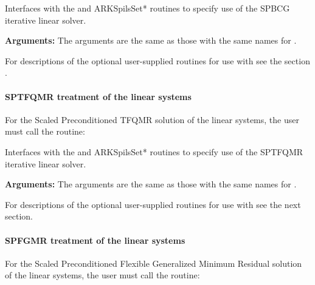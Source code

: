 \documentclass[letterpaper,10pt,english]{sphinxmanual}
\begin{document}
\begin{fulllineitems}
\label{f_interface/Usage:f/_/FARKSPBCG}
Interfaces with the {\hyperref[c_interface/User_callable:c.ARKSpbcg]{\emph{}}} and
ARKSpilsSet* routines to specify use of the SPBCG iterative
linear solver.

\textbf{Arguments:}  The arguments are the same as those with the
same names for {\hyperref[f_interface/Usage:f/_/FARKSPGMR]{\emph{}}}.

\end{fulllineitems}


For descriptions of the optional user-supplied routines for use with
{\hyperref[f_interface/Usage:f/_/FARKSPBCG]{\emph{}}} see the section {\hyperref[f_interface/Usage:finterface-spilsusersupplied]{\emph{}}}.


\paragraph{SPTFQMR treatment of the linear systems}
\label{f_interface/Usage:sptfqmr-treatment-of-the-linear-systems}
For the Scaled Preconditioned TFQMR solution of the linear systems,
the user must call the {\hyperref[f_interface/Usage:f/_/FARKSPTFQMR]{\emph{}}} routine:

\begin{fulllineitems}
\label{f_interface/Usage:f/_/FARKSPTFQMR}
Interfaces with the {\hyperref[c_interface/User_callable:c.ARKSptfqmr]{\emph{}}} and
ARKSpilsSet* routines to specify use of the SPTFQMR iterative
linear solver.

\textbf{Arguments:}  The arguments are the same as those with the same names
for {\hyperref[f_interface/Usage:f/_/FARKSPGMR]{\emph{}}}.

\end{fulllineitems}


For descriptions of the optional user-supplied routines for use with
{\hyperref[f_interface/Usage:f/_/FARKSPTFQMR]{\emph{}}} see the next section.


\paragraph{SPFGMR treatment of the linear systems}
\label{f_interface/Usage:spfgmr-treatment-of-the-linear-systems}
For the Scaled Preconditioned Flexible Generalized Minimum Residual
solution of the linear systems, the user must call the
{\hyperref[f_interface/Usage:f/_/FARKSPFGMR]{\emph{}}} routine:
\end{document}

